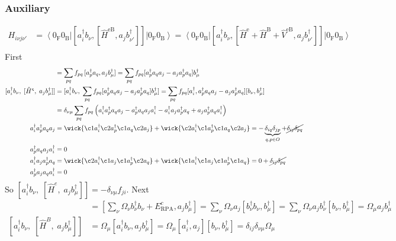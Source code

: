 \subsubsection{Auxiliary}
\begin{align}
H_{i \nu j \nu'} &= \left\langle 0_{\mathrm{F}} 0_{\mathrm{B}}\right|\left[a_i^{\dagger} b_\nu, \left[\hat{H}^{\mathrm{eB}}, a_j b_{\nu'}^{\dagger}\right]\right]\left|0_{\mathrm{F}} 0_{\mathrm{B}}\right\rangle = \left\langle 0_{\mathrm{F}} 0_{\mathrm{B}}\right|\left[a_i^{\dagger} b_\nu, \left[\hat{H}^{\mathrm{e}} + \hat{H}^{\mathrm{B}} + \hat{V}^{\mathrm{eB}}, a_j b_{\nu'}^{\dagger}\right]\right]\left|0_{\mathrm{F}} 0_{\mathrm{B}}\right\rangle \\
\end{align}
First
\begin{align}
[\hat H^e,\;a_j b_{\mu}^{\dagger}] &= \sum_{p q}f_{pq}\,[a_p^\dagger a_q, a_j b_{\mu}^{\dagger}] = \sum_{pq}f_{pq} [a_p^\dagger a_q a_j - a_j a_p^\dagger a_q] b_{\mu}^{\dagger} \\
[a_i^\dagger b_\nu,\;[\hat H^e,\;a_j b_{\mu}^{\dagger}]] &= [a_i^\dagger b_\nu,\; \sum_{pq}f_{pq} [a_p^\dagger a_q a_j - a_j a_p^\dagger a_q] b_{\mu}^{\dagger}] = \sum_{pq}f_{pq} [a_i^\dagger , a_p^\dagger a_q a_j - a_j a_p^\dagger a_q] [b_\nu, b_{\mu}^{\dagger}] \\
&= \delta_{\nu \mu} \sum_{pq}f_{pq} \left( a_i^\dagger a_p^\dagger a_q a_j - a_p^\dagger a_q a_j a_i^\dagger - a_i^\dagger a_j a_p^\dagger a_q + a_j a_p^\dagger a_q a_i^\dagger \right) \\
a_i^\dagger a_p^\dagger a_q a_j &= \wick{\c1 a_i^\dagger \c2 a_p^\dagger \c1 a_q \c2 a_j} + \wick{\c2 a_i^\dagger \c1 a_p^\dagger \c1 a_q \c2 a_j} = -\underbrace{\delta_{iq} \delta_{jp}}_{q,p \in O}+\cancel{\delta_{ij} \delta_{pq}} \\
a_p^\dagger a_q a_j a_i^\dagger &= 0 \\
a_i^\dagger a_j a_p^\dagger a_q &= \wick{\c2 a_i^\dagger \c1 a_j \c1 a_p^\dagger \c2 a_q} + \wick{\c1 a_i^\dagger \c1 a_j \c1 a_p^\dagger \c1 a_q} = 0 + \cancel{\delta_{ij} \delta_{pq}} \\
a_p^\dagger a_j a_q a_i^\dagger &= 0 \\
\end{align}
So $[a_i^\dagger b_\nu,\;[\hat H^e,\;a_j b_{\mu}^{\dagger}]] = - \delta_{\nu \mu} f_{ji}$.
Next
\begin{align}
[\hat H^B,\;a_j b_{\mu}^\dagger] &= [\sum_{\nu} \Omega_\nu {b}_\nu^{\dagger} {b}_\nu + E_{\mathrm{RPA}}^c, a_j b_{\mu}^\dag] = \sum_{\nu} \Omega_\nu a_j[ {b}_\nu^{\dagger} {b}_\nu, b_{\mu}^\dag]=\sum_{\nu} \Omega_\nu a_j {b}_\nu^{\dagger} [{b}_\nu, b_{\mu}^\dag]=\Omega_\mu a_j {b}_\mu^{\dagger} \\
[a_i^\dagger b_\nu,\;[\hat H^B,\;a_j b_{\mu}^\dagger]] &= \Omega_\mu [a_i^\dagger b_\nu, a_j {b}_\mu^{\dagger}] = \Omega_{\mu} [a_i^\dagger, a_j] [b_\nu, b_{\mu}^\dag] = \delta_{ij} \delta_{\nu \mu} \Omega_{\mu}\\
\end{align}
